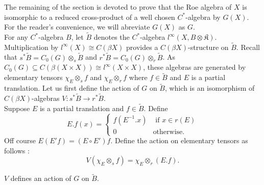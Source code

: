 The remaining of the section is devoted to prove that the Roe algebra of $X$ is isomorphic to a reduced cross-product of a well chosen $C^*$-algebra by $G(X)$. For the reader's convenience, we will abreviate $G(X)$ as $G$.\\

For any $C^*$-algebra $B$, let $\tilde B$ denotes the $C^*$-algebra $l^\infty(X,B\otimes\mathfrak K)$. Multiplication by $l^\infty(X)\cong C(\beta X)$ provides a $C(\beta X)$-structure on $\tilde B$. Recall that $s^* \tilde B = C_0(G)\otimes_s \tilde B$ and $r^* \tilde B = C_0(G)\otimes_r \tilde B$. As $C_0(G)\subseteq C(\beta(X\times X))\cong l^\infty(X\times X)$, these algebras are generated by elementary tensors $\chi_E\otimes_s f$ and $\chi_E\otimes_r f$ where $f\in\tilde B$ and $E$ is a partial translation. Let us first define the action of $G$ on $\tilde B$, which is an isomorphism of $C(\beta X)$-algebras $V :s^* \tilde B\rightarrow r^* \tilde B$.\\

Suppose $E$ is a partial translation and $f\in\tilde B$. Define 
\[E.f(x) = \left\{\begin{array}{ll} f(E^{-1}.x) & \text{ if }x\in r(E)\\ 0 & \text{otherwise.}\end{array}\right.\]
Off course $E(E'f)=(E\circ E')f$. Define the action on elementary tensors as follows :
\[V(\chi_E \otimes_s f) = \chi_E \otimes_r (E.f).\]

\begin{lem}
$V$ defines an action of $G$ on $\tilde B$.
\end{lem}

